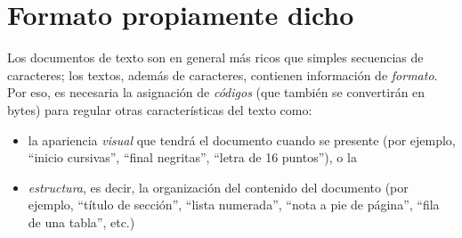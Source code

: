 \section{Formato propiamente dicho}\label{ss:format} Los documentos de texto son en general más ricos que simples secuencias de caracteres; los textos, además de caracteres, contienen información de \emph{formato}. Por eso, es necesaria la asignación de \emph{códigos} (que también se convertirán en bytes) para regular otras características del texto como: \begin{itemize} \item la apariencia \emph{visual} que tendrá el documento cuando se presente (por ejemplo, ``inicio cursivas'', ``final negritas'', ``letra de 16 puntos''), o la  \item \emph{estructura}, es decir, la organización del contenido del documento (por ejemplo, ``título de sección'', ``lista numerada'', ``nota a pie de página'', ``fila de una tabla'', etc.) \end{itemize} 


